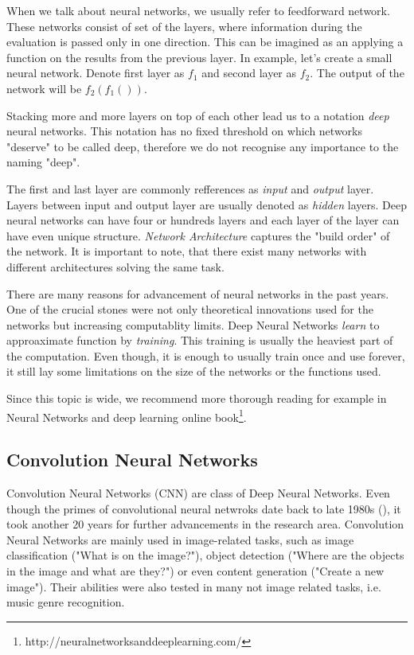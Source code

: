 When we talk about neural networks, we usually refer to feedforward network. These networks consist of set of the layers, where information during the evaluation is passed only in one direction. This can be imagined as an applying a function on the results from the previous layer. In example, let's create a small neural network. Denote first layer as \(f_1\) and second layer as \(f_2\). The output of the network will be \(f_2\left(f_1\left(\right)\right)\).

Stacking more and more layers on top of each other lead us to a notation \emph{deep} neural networks. This notation has no fixed threshold on which networks "deserve" to be called deep, therefore we do not recognise any importance to the naming "deep". 

The first and last layer are commonly refferences as \emph{input} and \emph{output} layer. Layers between input and output layer are usually denoted as \emph{hidden} layers. Deep neural networks can have four or hundreds layers and each layer of the layer can have even unique structure. \emph{Network Architecture} captures the "build order" of the network. It is important to note, that there exist many networks with different architectures solving the same task.

There are many reasons for advancement of neural networks in the past years. One of the crucial stones were not only theoretical innovations used for the networks but increasing computablity limits. Deep Neural Networks \emph{learn} to approaximate function by \emph{training}. This training is usually the heaviest part of the computation. Even though, it is enough to usually train once and use forever, it still lay some limitations on the size of the networks or the functions used.

Since this topic is wide, we recommend more thorough reading for example in Neural Networks and deep learning online book\footnote{http://neuralnetworksanddeeplearning.com/}.

\subsection{Convolution Neural Networks}

Convolution Neural Networks (CNN) are class of Deep Neural Networks. Even though the primes of convolutional neural netwroks date back to late 1980s (\cite{lecun1989backpropagation}), it took another 20 years for further advancements in the research area. Convolution Neural Networks are mainly used in image-related tasks, such as image classification ("What is on the image?"), object detection ("Where are the objects in the image and what are they?") or even content generation ("Create a new image"). Their abilities were also tested in many not image related tasks, i.e. music genre recognition.

